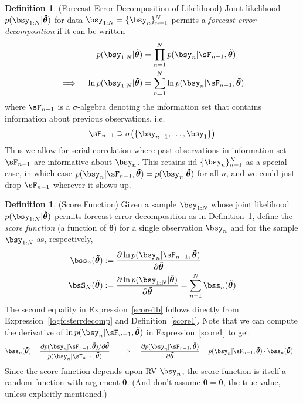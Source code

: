 \documentclass[12pt]{article}
\theoremstyle{plain}
\theoremstyle{definition}
\newtheorem{defn}[thm]{Definition}
\theoremstyle{remark}
\newcommand{\bstheta}{\boldsymbol{\theta}}
\newcommand{\bstildetheta}{\boldsymbol{\tilde{\theta}}}
\newcommand{\sumnN}{\sum^N_{n=1}}
\newcommand{\prodnN}{\prod^N_{n=1}}
\newcommand{\nN}{_{n=1}^N}
\begin{document}
\begin{defn}(Forecast Error Decomposition of Likelihood)
\label{defn:fcsterrdecomp}
Joint likelihood $p(\bsy_{1:N}|\bstildetheta)$ for data
$\bsy_{1:N}=\{\bsy_n\}\nN$ permits a \emph{forecast error decomposition}
if it can be written
\begin{align}
  p(\bsy_{1:N}|\bstildetheta)
  &= \prodnN p(\bsy_{n}|\sF_{n-1},\bstildetheta)
  \notag
  \\
  \implies\quad
  \ln p(\bsy_{1:N}|\bstildetheta)
  &= \sumnN \ln p(\bsy_{n}|\sF_{n-1},\bstildetheta)
  \label{logfcsterrdecomp}
\end{align}
where $\sF_{n-1}$ is a $\sigma$-algebra denoting the information set
that contains information about previous observations, i.e.
\begin{align*}
  \sF_{n-1} \supseteq
  \sigma\big(
  \{\bsy_{n-1},\ldots,\bsy_1\}
  \big)
\end{align*}
Thus we allow for serial correlation where past observations in
information set $\sF_{n-1}$ are informative about $\bsy_n$.
This retains iid $\{\bsy_n\}\nN$ as a special case, in which case
$p(\bsy_n|\sF_{n-1},\bstildetheta)=p(\bsy_n|\bstildetheta)$ for all $n$,
and we could just drop $\sF_{n-1}$ wherever it shows up.
\end{defn}

\begin{defn}(Score Function)
\label{defn:score}
Given a sample $\bsy_{1:N}$ whose joint likelihood
$p(\bsy_{1:N}|\bstildetheta)$ permits forecast error decomposition
as in Definition~\ref{defn:fcsterrdecomp}, define the
\emph{score function} (a function of $\bstildetheta$) for a single
observation $\bsy_n$ and for the sample $\bsy_{1:N}$ as, respectively,
\begin{align}
  \bss_n(\bstildetheta)
  &:=
  \frac{\partial \ln p(\bsy_n|\sF_{n-1},\bstildetheta)}{\partial \bstildetheta}
  \label{score1}
  \\
  \bsS_N(\bstildetheta)
  &:=
  \frac{\partial \ln p(\bsy_{1:N}|\bstildetheta)}{\partial \bstildetheta}
  = \sumnN \bss_n(\bstildetheta)
  \label{score1b}
\end{align}
The second equality in Expression~\ref{score1b} follows directly from
Expression~\ref{logfcsterrdecomp} and Definition~\ref{score1}.
Note that we can compute the derivative of $\ln
p(\bsy_n|\sF_{n-1},\bstildetheta)$ in Expression~\ref{score1} to get
\begin{align}
  \bss_n(\bstildetheta)
  =
  \frac{%
    \partial p(\bsy_n|\sF_{n-1},\bstildetheta)/\partial \bstildetheta
  }{p(\bsy_n|\sF_{n-1},\bstildetheta)}
  \quad
  \implies\quad
  \frac{\partial p(\bsy_n|\sF_{n-1},\bstildetheta)}{\partial \bstildetheta}
  &=
  p(\bsy_n|\sF_{n-1},\bstildetheta) \cdot \bss_n(\bstildetheta)
  \label{score3}
\end{align}
Since the score function depends upon RV $\bsy_n$, the score function is
itself a random function with argument $\bstildetheta$. (And don't
assume $\bstildetheta=\bstheta$, the true value, unless explicitly
mentioned.)
\end{defn}
\end{document}
